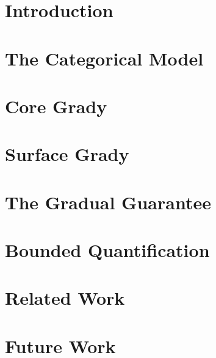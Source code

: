 \documentclass[sigplan]{acmart}\settopmatter{printfolios=true}
\begin{document}
\maketitle

\section{Introduction}
\label{sec:introduction}

\section{The Categorical Model}
\label{subsec:the_categorical_model}


\section{Core Grady}
\label{sec:core_grady}


\section{Surface Grady}
\label{sec:surface_grady}


\section{The Gradual Guarantee}
\label{sec:the_gradual_guarantee}


\section{Bounded Quantification}
\label{sec:bounded_quantification}


\section{Related Work}
\label{sec:related_work}



\section{Future Work}
\label{sec:conclusion}

\nocite{*}



\appendix





\end{document}
